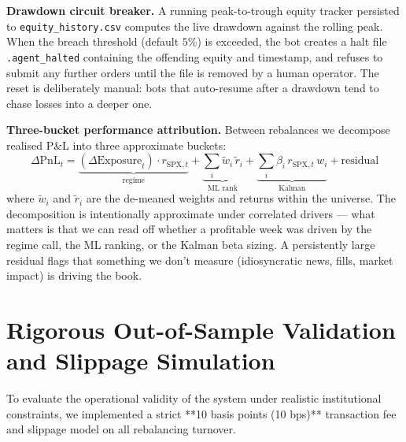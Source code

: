 \documentclass[10pt,journal,compsoc]{IEEEtran}
\begin{document}
\textbf{Drawdown circuit breaker.} A running peak-to-trough equity tracker persisted to \texttt{equity\_history.csv} computes the live drawdown against the rolling peak. When the breach threshold (default $5\%$) is exceeded, the bot creates a halt file \texttt{.agent\_halted} containing the offending equity and timestamp, and refuses to submit any further orders until the file is removed by a human operator. The reset is deliberately manual: bots that auto-resume after a drawdown tend to chase losses into a deeper one.

\textbf{Three-bucket performance attribution.} Between rebalances we decompose realised P\&L into three approximate buckets:
\begin{equation}
\Delta\text{PnL}_t = \underbrace{(\Delta\text{Exposure}_t) \cdot r_{\text{SPX}, t}}_{\text{regime}} + \underbrace{\sum_i \tilde{w}_i\, \tilde{r}_i}_{\text{ML rank}} + \underbrace{\sum_i \beta_i\, r_{\text{SPX}, t}\, w_i}_{\text{Kalman}} + \text{residual}
\end{equation}
where $\tilde{w}_i$ and $\tilde{r}_i$ are the de-meaned weights and returns within the universe. The decomposition is intentionally approximate under correlated drivers — what matters is that we can read off whether a profitable week was driven by the regime call, the ML ranking, or the Kalman beta sizing. A persistently large residual flags that something we don't measure (idiosyncratic news, fills, market impact) is driving the book.

\section{Rigorous Out-of-Sample Validation and Slippage Simulation}
\label{sec:bt}
To evaluate the operational validity of the system under realistic institutional constraints, we implemented a strict **10 basis points (10 bps)** transaction fee and slippage model on all rebalancing turnover.
\end{document}
